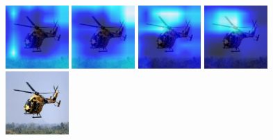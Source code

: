 \begin{figure}[H]
  {\includegraphics[height=2.4cm, width=2.4cm]{images/real-images/gradcam/5-5/2/Heat_map_of_iterations_0.png}}
  {\includegraphics[height=2.4cm, width=2.4cm]{images/real-images/gradcam/5-5/2/Heat_map_of_iterations_1.png}}
  {\includegraphics[height=2.4cm, width=2.4cm]{images/real-images/gradcam/5-5/2/Heat_map_of_iterations_3.png}}
%
  {\includegraphics[height=2.4cm, width=2.4cm]{images/real-images/gradcam/5-5/2/Heat_map_of_iterations_5.png}}
  {\includegraphics[height=2.4cm, width=2.4cm]{images/real-images/gradcam/5-5/2/Test_Images.png}}
  

\end{figure}
